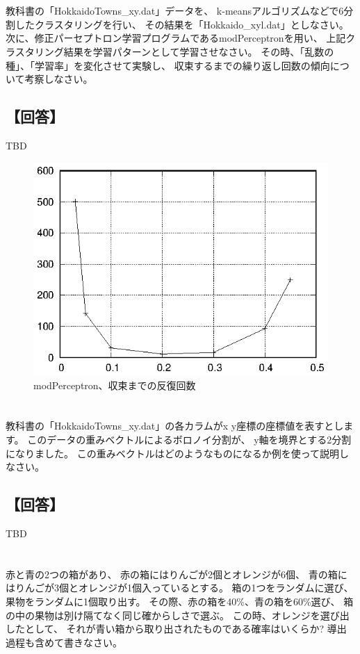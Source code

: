 \documentclass[a4j]{jarticle}
\begin{document}
\section{}
教科書の「HokkaidoTowns\_xy\@.dat」データを、
k-meansアルゴリズムなどで6分割したクラスタリングを行い、
その結果を「Hokkaido\_xyl\@.dat」としなさい。
次に、修正パーセプトロン学習プログラムであるmodPerceptronを用い、
上記クラスタリング結果を学習パターンとして学習させなさい。
その時、「乱数の種」、「学習率」を変化させて実験し、
収束するまでの繰り返し回数の傾向について考察しなさい。

\subsection{【回答】}
TBD

\begin{figure}[tbp]
 \begin{center}
  \includegraphics[width=0.5\hsize]{fig/modPerceptron.eps}
 \end{center}
 \caption{modPerceptron、収束までの反復回数}
 \label{fig:modPerceptron}
\end{figure}

\section{}
教科書の「HokkaidoTowns\_xy\@.dat」の各カラムがx y座標の座標値を表すとします。
このデータの重みベクトルによるボロノイ分割が、
y軸を境界とする2分割になりました。
この重みベクトルはどのようなものになるか例を使って説明しなさい。

\subsection{【回答】}
TBD

\section{}
赤と青の2つの箱があり、
赤の箱にはりんごが2個とオレンジが6個、
青の箱にはりんごが3個とオレンジが1個入っているとする。
箱の1つをランダムに選び、果物をランダムに1個取り出す。
その際、赤の箱を40\%、青の箱を60\%選び、
箱の中の果物は別け隔てなく同じ確からしさで選ぶ。
この時、オレンジを選び出したとして、
それが青い箱から取り出されたものである確率はいくらか?
導出過程も含めて書きなさい。
\end{document}
